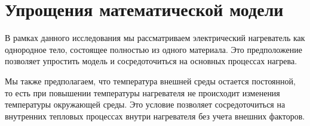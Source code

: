 \pagebreak

\section{Упрощения математической модели}
	В рамках данного исследования мы рассматриваем электрический нагреватель как однородное тело, состоящее полностью из одного материала. Это предположение позволяет упростить модель и сосредоточиться на основных процессах нагрева.

	Мы также предполагаем, что температура внешней среды остается постоянной, то есть при повышении температуры нагревателя не происходит изменения температуры окружающей среды. Это условие позволяет сосредоточиться на внутренних тепловых процессах внутри нагревателя без учета внешних факторов.

\pagebreak